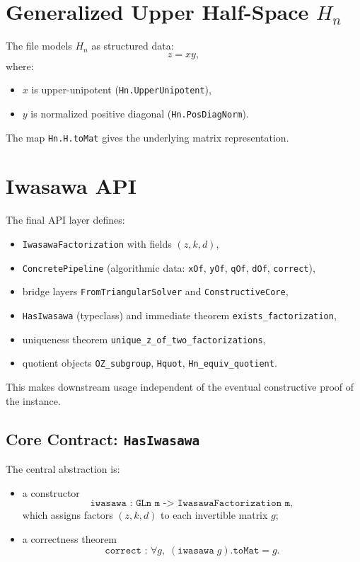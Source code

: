 \documentclass[11pt]{article}
\begin{document}
\section{Generalized Upper Half-Space \texorpdfstring{$H_n$}{Hn}}
The file models $H_n$ as structured data:
\[
z = x y,
\]
where:
\begin{itemize}[leftmargin=1.5em]
\item $x$ is upper-unipotent (\texttt{Hn.UpperUnipotent}),
\item $y$ is normalized positive diagonal (\texttt{Hn.PosDiagNorm}).
\end{itemize}
The map \texttt{Hn.H.toMat} gives the underlying matrix representation.

\section{Iwasawa API}
The final API layer defines:
\begin{itemize}[leftmargin=1.5em]
\item \texttt{IwasawaFactorization} with fields $(z,k,d)$,
\item \texttt{ConcretePipeline} (algorithmic data: \texttt{xOf}, \texttt{yOf}, \texttt{qOf}, \texttt{dOf}, \texttt{correct}),
\item bridge layers \texttt{FromTriangularSolver} and \texttt{ConstructiveCore},
\item \texttt{HasIwasawa} (typeclass) and immediate theorem \texttt{exists\_factorization},
\item uniqueness theorem \texttt{unique\_z\_of\_two\_factorizations},
\item quotient objects \texttt{OZ\_subgroup}, \texttt{Hquot}, \texttt{Hn\_equiv\_quotient}.
\end{itemize}
This makes downstream usage independent of the eventual constructive proof of the instance.

\subsection*{Core Contract: \texttt{HasIwasawa}}
The central abstraction is:
\begin{itemize}[leftmargin=1.5em]
\item a constructor
\[
\texttt{iwasawa : GLn m -> IwasawaFactorization m},
\]
which assigns factors $(z,k,d)$ to each invertible matrix $g$;
\item a correctness theorem
\[
\texttt{correct : }\forall g,\; (\texttt{iwasawa}\;g).\texttt{toMat} = g.
\]
\end{itemize}
\end{document}
